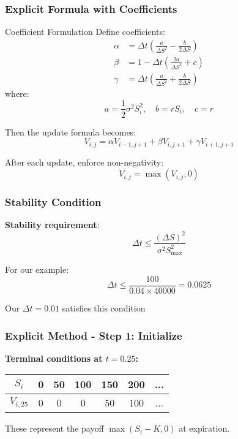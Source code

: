 \documentclass[aspectratio=169]{beamer}
\begin{document}
\begin{frame}
\frametitle{Explicit Formula with Coefficients}
\begin{block}{Coefficient Formulation}
Define coefficients:
\begin{align*}
\alpha &= \Delta t \left(\frac{a}{\Delta S^2} - \frac{b}{2\Delta S}\right) \\
\beta &= 1 - \Delta t \left(\frac{2a}{\Delta S^2} + c\right) \\
\gamma &= \Delta t \left(\frac{a}{\Delta S^2} + \frac{b}{2\Delta S}\right)
\end{align*}
where:
\[a = \frac{1}{2}\sigma^2 S_i^2, \quad b = rS_i, \quad c = r\]
\end{block}
\end{frame}

\begin{frame}
  
Then the update formula becomes:
\[V_{i,j} = \alpha V_{i-1,j+1} + \beta V_{i,j+1} + \gamma V_{i+1,j+1}\]


\end{frame}

\begin{frame}
  After each update, enforce non-negativity:
\[V_{i,j} = \max(V_{i,j}, 0)\]
\end{frame}

\begin{frame}
\frametitle{Stability Condition}
\textbf{Stability requirement}: 
\[\Delta t \leq \frac{(\Delta S)^2}{\sigma^2 S_{\max}^2}\]

For our example:
\[\Delta t \leq \frac{100}{0.04 \times 40000} = 0.0625\]

Our $\Delta t = 0.01$ satisfies this condition \checkmark
\end{frame}

\begin{frame}
\frametitle{Explicit Method - Step 1: Initialize}
\textbf{Terminal conditions at $t = 0.25$:}

\begin{center}
\begin{tabular}{c|c|c|c|c|c|c}
$S_i$ & 0 & 50 & 100 & 150 & 200 & ... \\
\hline
$V_{i,25}$ & 0 & 0 & 0 & 50 & 100 & ...
\end{tabular}
\end{center}

These represent the payoff $\max(S_i - K, 0)$ at expiration.
\end{frame}
\end{document}

